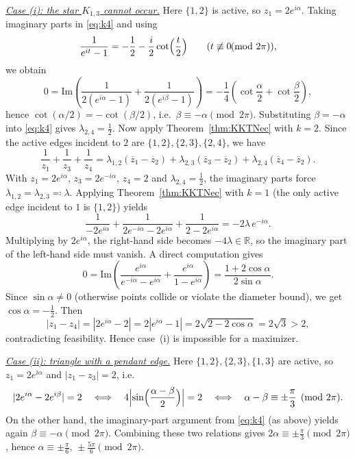 \documentclass{article}
\theoremstyle{definition}
\renewcommand*{\Im}{\mathrm{Im}}
\newcounter{row}
\newcounter{col}
\begin{document}
\smallskip
\noindent\underline{\emph{Case (i): the star \(K_{1,3}\) cannot occur.}}
Here \(\{1,2\}\) is active, so \(z_1=2e^{i\alpha}\).
Taking imaginary parts in \eqref{eq:k4} and using
\[
\frac1{e^{it}-1}=-\frac12-\frac i2\cot\Bigl(\frac t2\Bigr)\qquad(t\not\equiv 0\!\!\!\pmod{2\pi}),
\]
we obtain
\[
0=\Im\!\left(\frac1{2(e^{i\alpha}-1)}+\frac1{2(e^{i\beta}-1)}\right)
=-\frac14\left(\cot\frac{\alpha}{2}+\cot\frac{\beta}{2}\right),
\]
hence \(\cot(\alpha/2)=-\cot(\beta/2)\), i.e.\ \(\beta\equiv-\alpha\pmod{2\pi}\).
Substituting \(\beta=-\alpha\) into \eqref{eq:k4} gives \(\lambda_{2,4}=\frac12\). Now apply Theorem~\ref{thm:KKTNec} with \(k=2\).
Since the active edges incident to \(2\) are \(\{1,2\},\{2,3\},\{2,4\}\), we have
\[
\frac1{z_1}+\frac1{z_3}+\frac1{z_4}
=\lambda_{1,2}(\overline z_1-\overline z_2)+\lambda_{2,3}(\overline z_3-\overline z_2)+\lambda_{2,4}(\overline z_4-\overline z_2).
\]
With \(z_1=2e^{i\alpha}\), \(z_3=2e^{-i\alpha}\), \(z_4=2\) and \(\lambda_{2,4}=\tfrac12\), the imaginary parts force
\(\lambda_{1,2}=\lambda_{2,3}\eqqcolon\lambda\).
Applying Theorem~\ref{thm:KKTNec} with \(k=1\) (the only active edge incident to \(1\) is \(\{1,2\}\)) yields
\[
\frac1{-2e^{i\alpha}}+\frac1{2e^{-i\alpha}-2e^{i\alpha}}+\frac1{2-2e^{i\alpha}}
=-2\lambda\,e^{-i\alpha}.
\]
Multiplying by \(2e^{i\alpha}\), the right-hand side becomes \(-4\lambda\in\mathbb R\), so the imaginary part of the left-hand side must vanish.
A direct computation gives
\[
0=\Im\!\left(\frac{e^{i\alpha}}{e^{-i\alpha}-e^{i\alpha}}+\frac{e^{i\alpha}}{1-e^{i\alpha}}\right)
=\frac{1+2\cos\alpha}{2\sin\alpha}.
\]
Since \(\sin\alpha\neq 0\) (otherwise points collide or violate the diameter bound), we get \(\cos\alpha=-\tfrac12\).
Then
\[
|z_1-z_4|=|2e^{i\alpha}-2|=2|e^{i\alpha}-1|=2\sqrt{2-2\cos\alpha}=2\sqrt3>2,
\]
contradicting feasibility. Hence case~(i) is impossible for a maximizer.

\smallskip
\noindent\underline{\emph{Case (ii): triangle with a pendant edge.}}
Here \(\{1,2\},\{2,3\},\{1,3\}\) are active, so
\(
z_1=2e^{i\alpha}
\)
and
\(
|z_1-z_3|=2
\),
i.e.
\[
|2e^{i\alpha}-2e^{i\beta}|=2
\quad\Longleftrightarrow\quad
4\Bigl|\sin\Bigl(\frac{\alpha-\beta}{2}\Bigr)\Bigr|=2
\quad\Longleftrightarrow\quad
\alpha-\beta\equiv \pm\frac{\pi}{3}\pmod{2\pi}.
\]
On the other hand, the imaginary-part argument from \eqref{eq:k4} (as above) yields again
\(\beta\equiv-\alpha\pmod{2\pi}\).
Combining these two relations gives
\(
2\alpha\equiv\pm\frac{\pi}{3}\pmod{2\pi}
\),
hence \(\alpha\equiv \pm\frac{\pi}{6},\,\pm\frac{5\pi}{6}\pmod{2\pi}\).
\end{document}
